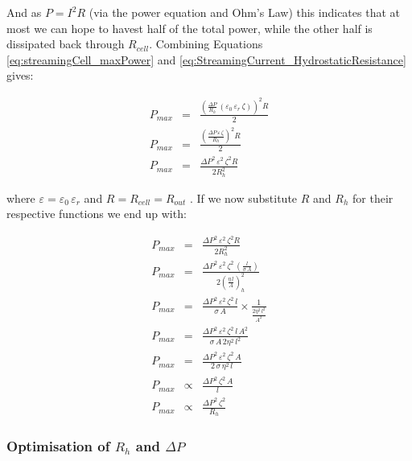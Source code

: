 And as $P=I^{2}R$ (via the power equation and Ohm's Law) this indicates that at
most we can hope to havest half of the total power, while the other half is
dissipated back through $R_{cell}$. Combining Equations
\ref{eq:streamingCell_maxPower} and
\ref{eq:StreamingCurrent_HydrostaticResistance} gives:

\begin{eqnarray*} P_{max} & = & \frac{\left(\frac{\Delta
                P}{R_{h}}\,\left(\varepsilon_{0}\,\varepsilon_{r}\,\zeta\right)\right)^{2}R}{2}\\
    P_{max} & = & \frac{\left(\frac{\Delta
                P\,\varepsilon\,\zeta}{R_{h}}\right)^{2}R}{2}\\ P_{max} & = &
    \frac{\Delta P^{2}\,\varepsilon^{2}\,\zeta^{2}R}{2R_{h}^{2}}
\end{eqnarray*}


where $\varepsilon=\varepsilon_{0}\,\varepsilon_{r}$ and $R=R_{cell}=R_{out}$ .
If we now substitute $R$ and $R_{h}$ for their respective functions we end up
with:

\begin{eqnarray} P_{max} & = & \frac{\Delta
        P^{2}\,\varepsilon^{2}\,\zeta^{2}R}{2R_{h}^{2}}\nonumber \\ P_{max} & =
    & \frac{\Delta P^{2}\,\varepsilon^{2}\,\zeta^{2}\,\left(\frac{l}{\sigma\,
                A}\right)}{2\left(\frac{\eta\, l}{A}\right)_{h}^{2}}\nonumber
    \\ P_{max} & = & \frac{\Delta P^{2}\,\varepsilon^{2}\,\zeta^{2}\,
        l}{\sigma\, A}\times\frac{1}{\frac{2\eta^{2}\, l^{2}}{A^{2}}}\nonumber
    \\ P_{max} & = & \frac{\Delta P^{2}\,\varepsilon^{2}\,\zeta^{2}\, l\,
        A^{2}}{\sigma\, A\,2\eta^{2}\, l^{2}}\nonumber \\ P_{max} & = &
    \frac{\Delta P^{2}\,\varepsilon^{2}\,\zeta^{2}\, A}{2\,\sigma\,\eta^{2}\,
        l}\nonumber \\ P_{max} & \propto & \frac{\Delta P^{2}\,\zeta^{2}\,
        A}{l}\nonumber \\ P_{max} & \propto & \frac{\Delta
        P^{2}\,\zeta^{2}}{R_{h}} \end{eqnarray}



\subsubsection*{Optimisation of $R_{h}$ and $\Delta P$}

